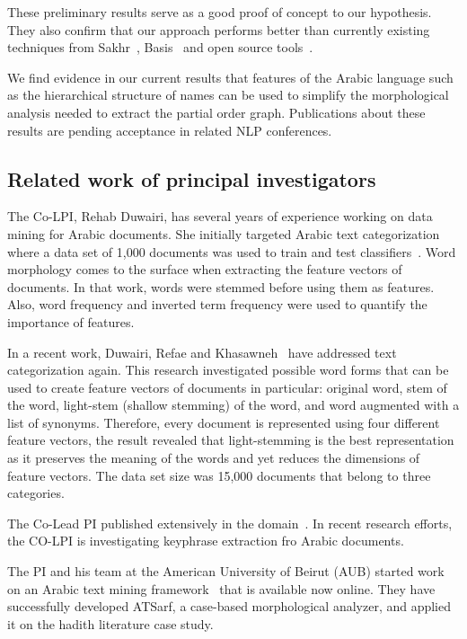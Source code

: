 \documentclass[12pt]{article}
\begin{document}
These preliminary results serve as a good proof of concept to our 
hypothesis. They also confirm that our approach performs better than 
currently existing techniques from Sakhr~\cite{Sak09},
Basis~\cite{Bas09} and open source 
tools~\cite{Col09,Otakar:07,Tim04}.

We find evidence in our current results that features 
of the Arabic language such as the hierarchical structure of
names can be used to simplify the morphological analysis
needed to extract the partial order graph. 
Publications about these results are pending acceptance in 
related NLP conferences. 

\subsection{Related work of principal investigators}

The Co-LPI, Rehab Duwairi, has several years of experience 
working on data mining for Arabic documents. 
She initially targeted Arabic text categorization where a 
data set of 1,000 documents was used to train and test 
classifiers~\cite{Duw06,Duw07}.
Word morphology comes to the surface when extracting the 
feature vectors of documents. 
In that work, words were stemmed before using them as features. 
Also, word frequency and inverted term frequency were used to 
quantify the importance of features. 

In a recent work, Duwairi, Refae and Khasawneh~\cite{Duw09}
have addressed text categorization again. 
This research investigated possible word forms that can be 
used to create feature vectors of documents in particular: 
original word, stem of the word, light-stem (shallow stemming) 
of the word, and word augmented with a list of synonyms. 
Therefore, every document is represented using four different 
feature vectors, the result revealed that light-stemming is the 
best representation as it preserves the meaning of the words 
and yet reduces the dimensions of feature vectors. 
The data set size was 15,000 documents that belong to three 
categories. 

The Co-Lead PI published extensively in the 
domain~\cite{Duw06, Duw07, Duw09}.
In recent research efforts, the CO-LPI is investigating 
keyphrase extraction fro Arabic documents.

The PI and his team at the American University of Beirut (AUB)
started work on an Arabic text mining framework~\cite{ATMine09}
that is available now online.
They have successfully developed ATSarf, a case-based morphological 
analyzer, and applied it on the hadith literature case study. 
\end{document}
